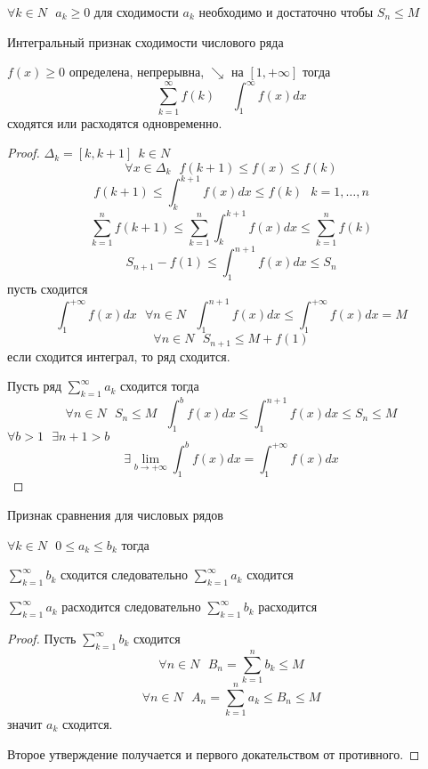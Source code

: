 \begin{block}[Критерий]
  $
  \forall k \in N ~~~
  a_k \ge 0
  $
  для сходимости $a_k$ необходимо и достаточно чтобы $S_n \le M$
\end{block}

\begin{title}[\Large]
  Интегральный признак сходимости числового ряда
\end{title}

\begin{block}
  $f(x) \ge 0$ определена, непрерывна, $\searrow$ на $[1, +\infty]$ тогда
  $$
  \sum_{k=1}^{\infty} f(k) ~~~~~~ \int_1^{\infty} f(x)dx
  $$
  сходятся или расходятся одновременно.
\end{block}

\begin{proof}
  $\Delta_k = [k, k+1] ~~ k \in N$
  $$
  \forall x \in \Delta_k ~~~ f(k+1) \le f(x) \le f(k)
  $$
  $$
  f(k+1) \le \int_k^{k+1} f(x)dx \le f(k) ~~~ k = 1, \ldots, n
  $$
  $$
  \sum_{k=1}^n f(k+1) \le \sum_{k=1}^n \int_k^{k+1} f(x)dx \le \sum_{k=1}^n f(k)
  $$
  $$
  S_{n+1} - f(1) \le \int_1^{n+1} f(x)dx \le S_n
  $$
  пусть сходится
  $$
  \int_1^{+\infty} f(x)dx ~~~ \forall n \in N ~~~
  \int_1^{n+1} f(x)dx \le \int_1^{+\infty} f(x) dx = M
  $$
  $$
  \forall n \in N ~~~ S_{n+1} \le M + f(1)
  $$
  если сходится интеграл, то ряд сходится.

  Пусть ряд $\sum_{k=1}^{\infty} a_k$ сходится тогда
  $$
  \forall n \in N ~~~
  S_n \le M ~~~
  \int_1^b f(x)dx \le \int_1^{n+1} f(x)dx \le S_n \le M
  $$
  $\forall b>1 ~~~ \exists n+1 > b$
  $$
  \exists \lim_{b \to +\infty} \int_1^b f(x)dx = \int_1^{+ \infty} f(x)dx
  $$
\end{proof}

\begin{title}[\Large]
  Признак сравнения для числовых рядов
\end{title}

\begin{block}
  $\forall k \in N ~~~ 0 \le a_k \le b_k$ тогда

  $\sum_{k=1}^{\infty} b_k$ сходится следовательно $\sum_{k=1}^{\infty} a_k$
  сходится

  $\sum_{k=1}^{\infty} a_k$ расходится следовательно $\sum_{k=1}^{\infty} b_k$
  расходится
\end{block}

\begin{proof}
  Пусть $\sum_{k=1}^{\infty} b_k$ сходится
  $$
  \forall n \in N ~~~ B_n = \sum_{k=1}^n b_k \le M
  $$
  $$
  \forall n \in N ~~~ A_n = \sum_{k=1}^n a_k \le B_n \le M
  $$
  значит $a_k$ сходится.

  Второе утверждение получается и первого докательством от противного.
\end{proof}

